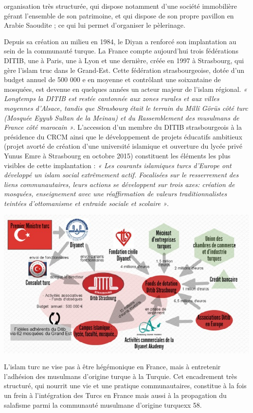 organisation très structurée, qui dispose notamment d'une société
immobilière gérant l'ensemble de son patrimoine, et qui dispose de son
propre pavillon en Arabie Saoudite ; ce qui lui permet d'organiser le
pèlerinage.

Depuis sa création au milieu en 1984, le Diyan a renforcé son
implantation au sein de la communauté turque. La France compte
aujourd'hui trois fédérations DITIB, une à Paris, une à Lyon et une
dernière, créée en 1997 à Strasbourg, qui gère l'islam truc dans le
Grand-Est. Cette fédération strasbourgeoise, dotée d'un budget annuel de
500 000 e en moyenne et contrôlant une soixantaine de mosquées, est
devenue en quelques années un acteur majeur de l'islam régional. \emph{«
Longtemps la DITIB est restée cantonnée aux zones rurales et aux villes
moyennes d'Alsace, tandis que Strasbourg était le terrain du Millî Görüs
côté turc (Mosquée Eyyub Sultan de la Meinau) et du Rassemblement des
musulmans de France côté marocain »}. L'accession d'un membre du
DITIB strasbourgeois à la présidence du CRCM ainsi que le développement
de projets éducatifs ambitieux (projet avorté de création d'une
université islamique et ouverture du lycée privé Yunus Emre à Strasbourg
en octobre 2015) constituent les éléments les plus visibles de cette
implantation : \emph{« Les courants islamiques turcs d'Europe ont
développé un islam social extrêmement actif. Focalisées sur le
resserrement des liens communautaires, leurs actions se développent sur
trois axes: création de mosquées, enseignement avec une réaffirmation de
valeurs traditionnalistes teintées d'ottomanisme et entraide sociale et
scolaire »}.


\includegraphics[width=\textwidth]{ImageIslamFrance/media/image8.jpeg}


L'islam turc ne vise pas à être hégémonique en France, mais à entretenir
l'adhésion des musulmans d'origine turque à la Turquie. Cet encadrement
très structuré, qui nourrit une vie et une pratique communautaires,
constitue à la fois un frein à l'intégration des Turcs en France mais
aussi à la propagation du salafisme parmi la communauté musulmane
d'origine turquexx 58.

